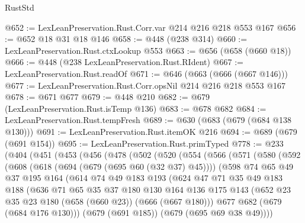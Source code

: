 \begin{lexlean}{RustStd}
\begin{coremodule}
{\begin{coremodule}
{{{{{@652 := LexLeanPreservation.Rust.Corr.var @214 @216 @218 @553 @167
@656 := @652 @18 @31 @18 @146
@658 := @448 (@238 @314)
@660 := LexLeanPreservation.Rust.ctxLookup @553
@663 := @656 (@658 (@660 @18))
@666 := @448 (@238 LexLeanPreservation.Rust.RIdent)
@667 := LexLeanPreservation.Rust.readOf
@671 := @646 (@663 (@666 (@667 @146)))
@677 := LexLeanPreservation.Rust.Corr.opsNil @214 @216 @218 @553 @167
@678 := @671 @677
@679 := @448 @210
@682 := @679 (LexLeanPreservation.Rust.isTemp @136)
@683 := @678 @682
@684 := LexLeanPreservation.Rust.tempFresh
@689 := @630 (@683 (@679 (@684 @138 @130)))
@691 := LexLeanPreservation.Rust.itemOK @216
@694 := @689 (@679 (@691 @154))
@695 := LexLeanPreservation.Rust.primTyped
@778 := @233
    (@404
      (@451
        (@453
          (@456
            (@478
              (@502
                (@520
                  (@554
                    (@566
                      (@571
                        (@580
                          (@592
                            (@608
                              (@618 (@694 (@679 (@695 @60 (@32 @37) @45))))
                              (@598
                                @74
                                @65
                                @49
                                @37
                                @195
                                @164
                                (@614
                                  @74
                                  @49
                                  @183
                                  @193
                                  (@624
                                    @47
                                    @71
                                    @35
                                    @49
                                    @183
                                    @188
                                    (@636
                                      @71
                                      @65
                                      @35
                                      @37
                                      @180
                                      @130
                                      @164
                                      @136
                                      @175
                                      @143
                                      (@652 @23 @35 @23 @180 (@658 (@660 @23)) (@666 (@667 @180)))
                                      @677
                                      @682
                                      (@679 (@684 @176 @130)))
                                    (@679 (@691 @185))
                                    (@679 (@695 @69 @38 @49))))
}}}}}
\end{coremodule}}
\end{coremodule}
\end{lexlean}

